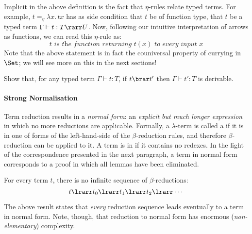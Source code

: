 \documentclass{svmult}
\begin{document}
%
Implicit in the above definition is the fact that $\eta$-rules relate typed terms. For example, $t=_\eta\lambda x.\,tx$ has as side condition that $t$ be of function type, \ie that $t$ be a typed term $\Gamma\vdash t:T\rarr U$.
Now, following our intuitive interpretation of arrows as functions, we can read this $\eta$-rule as:
\[ \textit{$t$ is the function returning $t(x)$ to every input $x$}\]
Note that the above statement is in fact the couniversal property of currying in $\Set$; we will see more on this in the next sections!
%
\begin{myexercise}[Subject Reduction]
    Show that, for any typed term $\Gamma\vdash t:T$, if $t\brar t'$ then $\Gamma\vdash t':T$ is derivable.
\end{myexercise}

\paragraph{Strong Normalisation} Term reduction results in a \emph{normal form}: an \emph{explicit but much longer expression} in which
no more reductions are applicable.
%
Formally, a $\lambda$-term is called a  if it is in one of forms of the left-hand-side of the $\beta$-reduction rules,
and therefore $\beta$-reduction can be applied to it. A term is in  if it contains no redexes.
In the light of the correspondence presented in the next paragraph, a term in normal form corresponds to a proof in which all lemmas have been eliminated.
\begin{fact}[SN]
For every term $t$, there is no infinite sequence of $\beta$-reductions:
\[ t\lrarr t_0\lrarr t_1\lrarr t_2\lrarr \cdots \]
\end{fact}
%
The above result states that \emph{every} reduction sequence leads eventually to a term in normal form. Note, though,
that reduction to normal form has enormous (\emph{non-elementary}) complexity.
\end{document}
